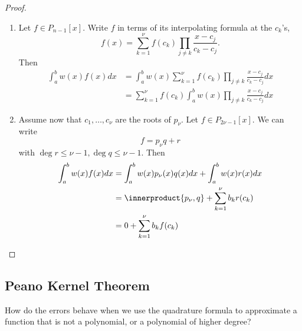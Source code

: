 \documentclass[a4paper]{article}
\newcommand*{\inner}{\innerproduct}
\begin{document}
\begin{proof}\leavevmode
  \begin{enumerate}
  \item Let \(f \in P_{n - 1}[x]\). Write \(f\) in terms of its interpolating formula at the \(c_k\)'s,
    \[
      f(x) = \sum_{k = 1}^\nu f(c_k) \prod_{j \neq k} \frac{x - c_j}{c_k - c_j}.
    \]
    Then
    \begin{align*}
      \int_a^b w(x)f(x) dx &= \int_a^b w(x) \sum_{k = 1}^\nu f(c_k) \prod_{j \neq k} \frac{x - c_j}{c_k - c_j} dx \\
                           &= \sum_{k = 1}^\nu f(c_k) \int_a^b w(x) \prod_{j \neq k} \frac{x - c_j}{c_k - c_j} dx
    \end{align*}
  \item Assume now that \(c_1, \dots, c_\nu\) are the roots of \(p_\nu\). Let \(f \in P_{2\nu - 1}[x]\). We can write
    \[
      f = p_\nu q + r
    \]
    with \(\deg r \leq \nu - 1, \deg q \leq \nu - 1\). Then
    \begin{align*}
      \int_a^b w(x)f(x) dx &= \int_a^b w(x)p_\nu(x) q(x) dx + \int_a^b w(x)r(x) dx \\
                           &= \inner{p_\nu, q} + \sum_{k = 1}^\nu b_k r(c_k) \\
                           &= 0 + \sum_{k = 1}^\nu b_kf(c_k)
    \end{align*}
  \end{enumerate}
\end{proof}

\subsection{Peano Kernel Theorem}

How do the errors behave when we use the quadrature formula to approximate a function that is not a polynomial, or a polynomial of higher degree?
\end{document}
